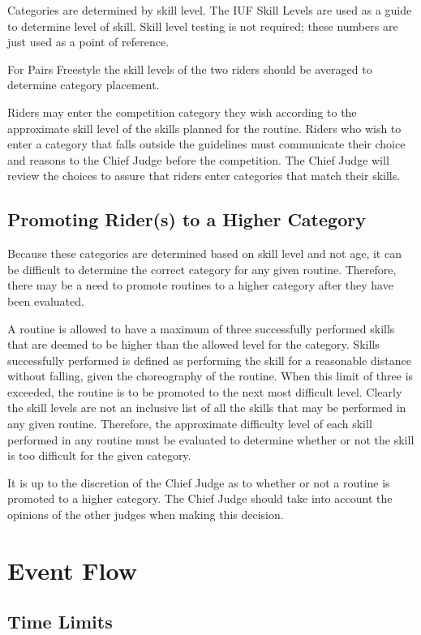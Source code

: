 Categories are determined by skill level.
The IUF Skill Levels are used as a guide to determine level of skill.
Skill level testing is not required; these numbers are just used as a point of reference.

For Pairs Freestyle the skill levels of the two riders should be averaged to determine category placement.

Riders may enter the competition category they wish according to the approximate skill
level of the skills planned for the routine.
Riders who wish to enter a category that falls outside the guidelines must communicate their choice and reasons to the Chief Judge before the competition.
The Chief Judge will review the choices to assure that riders enter categories that match their skills.

\subsection{Promoting Rider(s) to a Higher Category}
Because these categories are determined based on skill level and not age, it can be difficult to determine the correct category for any given routine.
Therefore, there may be a need to promote routines to a higher category after they have been evaluated.

A routine is allowed to have a maximum of three successfully performed skills that are deemed to be higher than the allowed level for the category.
Skills successfully performed is defined as performing the skill for a reasonable distance without falling, given the choreography of the routine.
When this limit of three is exceeded, the routine is to be promoted to the next most difficult level.
Clearly the skill levels are not an inclusive list of all the skills that may be performed in any given routine.
Therefore, the approximate difficulty level of each skill performed in any routine must be evaluated to determine whether or not the skill is too difficult for the given category.

It is up to the discretion of the Chief Judge as to whether or not a routine is promoted to a higher category.
The Chief Judge should take into account the opinions of the other judges when making this decision.

\section{Event Flow}

\subsection{Time Limits}

